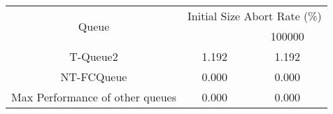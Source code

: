 \begin{tabular}{|c|c|c|}
\hline
\multirow{2}{*}{Queue} & \multicolumn{2}{c|}{Initial Size Abort Rate (\%)}\\\cline{2-3}& \qquad 10000 \qquad\quad & 100000\\
\hline
\hline
T-Queue2 & 1.192 & 1.192\\
NT-FCQueue & 0.000 & 0.000\\
Max Performance of other queues & 0.000 & 0.000\\
\hline\end{tabular}
